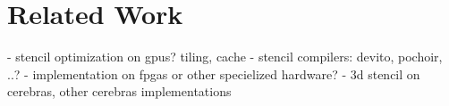 \chapter{Related Work}
- stencil optimization on gpus? tiling, cache
- stencil compilers: devito, pochoir, ..?
- implementation on fpgas or other specielized hardware?
- 3d stencil on cerebras, other cerebras implementations 